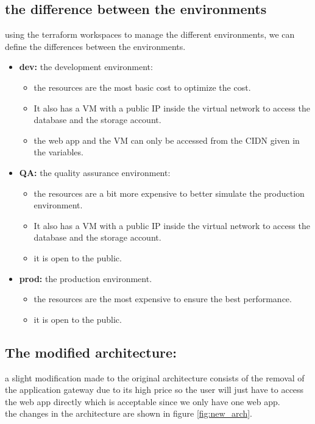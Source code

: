 \subsection{the difference between the environments} 
using the terraform workspaces to manage the different environments, we can define the differences between the environments.
\begin{itemize}
    \item \textbf{dev:} the development environment:
          \begin{itemize}
              \item the resources are the most basic cost to optimize the cost.
              \item It also has a VM with a public IP inside the virtual network to access the database and the storage account.
              \item the web app and the VM can only be accessed from the CIDN given in the variables.
          \end{itemize}
    \item \textbf{QA:} the quality assurance environment:
          \begin{itemize}
              \item the resources are a bit more expensive to better simulate the production environment.
              \item It also has a VM with a public IP inside the virtual network to access the database and the storage account.
              \item it is open to the public.
          \end{itemize}
    \item \textbf{prod:} the production environment.
          \begin{itemize}
              \item the resources are the most expensive to ensure the best performance.
              \item it is open to the public.
          \end{itemize}
\end{itemize}


\subsection{The modified architecture:}
a slight modification made to the original architecture consists of the removal of the application gateway due to its high price so the user will just have to access the web app directly which is acceptable since we only have one web app.
\\ the changes in the architecture are shown in figure \ref{fig:new_arch}.

